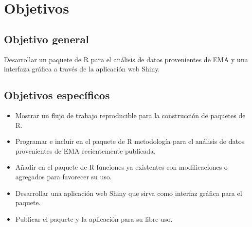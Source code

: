 \chapter{Objetivos}
\section{Objetivo general}
 
Desarrollar un paquete de R para el análisis de datos provenientes de EMA y una interfaza gráfica a través de la aplicación web Shiny.


\section{Objetivos específicos}
\begin{itemize}
\item Mostrar un flujo de trabajo reproducible para la construcción de paquetes de R.
\item Programar e incluir en el paquete de R metodología para el análisis de datos provenientes de EMA recientemente publicada.
\item Añadir en el paquete de R funciones ya existentes con modificaciones o agregados para favorecer su uso.
\item Desarrollar una aplicación web Shiny que sirva como interfaz gráfica para el paquete.
\item Publicar el paquete y la aplicación para su libre uso.
\end{itemize}

